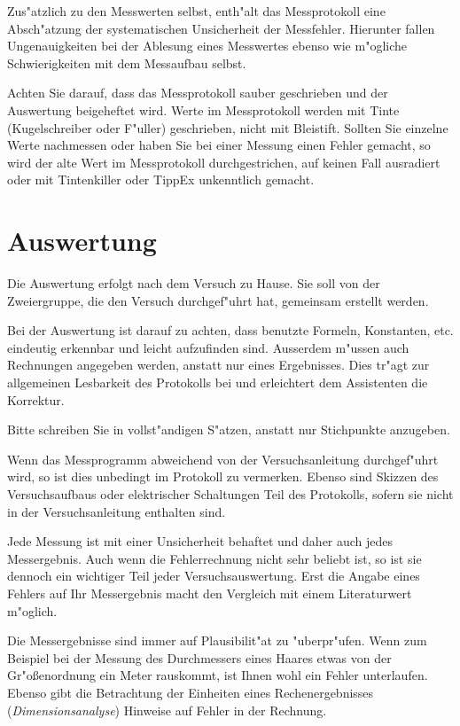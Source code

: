 Zus"atzlich zu den Messwerten selbst, enth"alt das Messprotokoll eine Absch"atzung der systematischen Unsicherheit der Messfehler. Hierunter fallen Ungenauigkeiten bei der Ablesung eines Messwertes ebenso wie m"ogliche Schwierigkeiten mit dem Messaufbau selbst.

Achten Sie darauf, dass das Messprotokoll sauber geschrieben und der Auswertung beigeheftet wird. Werte im Messprotokoll werden mit Tinte (Kugelschreiber oder F"uller) geschrieben, nicht mit Bleistift. Sollten Sie einzelne Werte nachmessen oder haben Sie bei einer Messung einen Fehler gemacht, so wird der alte Wert im Messprotokoll durchgestrichen, auf keinen Fall ausradiert oder mit Tintenkiller oder TippEx unkenntlich gemacht.

\section{Auswertung}

Die Auswertung erfolgt nach dem Versuch zu Hause. Sie soll von der Zweiergruppe, die den Versuch durchgef"uhrt hat, gemeinsam erstellt werden.

Bei der Auswertung ist darauf zu achten, dass benutzte Formeln, Konstanten, etc. eindeutig erkennbar und leicht aufzufinden sind. Ausserdem m"ussen auch Rechnungen angegeben werden, anstatt nur eines Ergebnisses. Dies tr"agt zur allgemeinen Lesbarkeit des Protokolls bei und erleichtert dem Assistenten die Korrektur.

Bitte schreiben Sie in vollst"andigen S"atzen, anstatt nur Stichpunkte anzugeben. 

Wenn das Messprogramm abweichend von der Versuchsanleitung durchgef"uhrt wird, so ist dies unbedingt im Protokoll zu vermerken. Ebenso sind Skizzen des Versuchsaufbaus oder elektrischer Schaltungen Teil des Protokolls, sofern sie nicht in der Versuchsanleitung enthalten sind.

\begin{hint}
	Jede Messung ist mit einer Unsicherheit behaftet und daher auch jedes Messergebnis. Auch wenn die Fehlerrechnung nicht sehr beliebt ist, so ist sie dennoch ein wichtiger Teil jeder Versuchsauswertung. Erst die Angabe eines 	Fehlers auf Ihr Messergebnis macht den Vergleich mit einem Literaturwert m"oglich.
\end{hint}

Die Messergebnisse sind immer auf Plausibilit"at zu "uberpr"ufen. Wenn zum Beispiel bei der Messung des Durchmessers eines Haares etwas von der Gr"o{\ss}enordnung ein Meter rauskommt, ist Ihnen wohl ein Fehler unterlaufen. Ebenso gibt die Betrachtung der Einheiten eines Rechenergebnisses (\textit{Dimensionsanalyse}) Hinweise auf Fehler in der Rechnung. 

